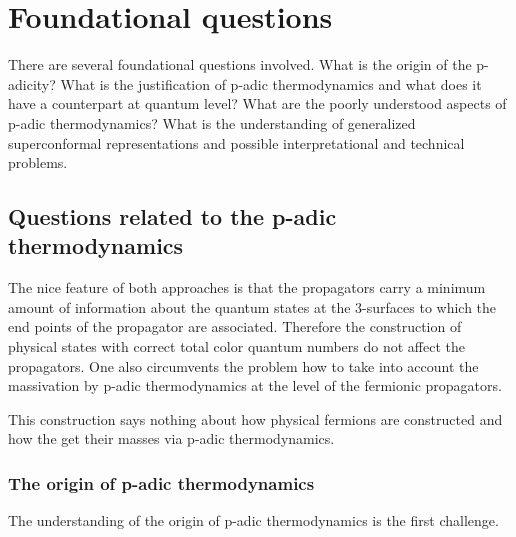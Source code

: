 \documentclass[10pt,epsf]{article}
\begin{document}
\section{Foundational questions}

There are several foundational questions involved. What is the origin of the p-adicity? What is the justification of p-adic thermodynamics and what does it have a counterpart at quantum level? What are the poorly understood aspects of p-adic thermodynamics? What is the understanding of generalized superconformal representations and possible  interpretational and technical problems.


\subsection{Questions related to the p-adic thermodynamics}

The nice feature of both approaches is  that the propagators carry a minimum amount of information  about the quantum states at the 3-surfaces to which the end points of the propagator are associated. Therefore   the construction of physical states with correct total color quantum numbers do not affect the propagators. One also   circumvents the problem how to take into account the massivation by p-adic thermodynamics at the level of the fermionic propagators. 

This construction says nothing about how physical fermions are constructed and how the get their masses via p-adic thermodynamics.


\subsubsection{The origin of p-adic thermodynamics}

The understanding of the origin of p-adic thermodynamics is the first challenge.
\end{document}

